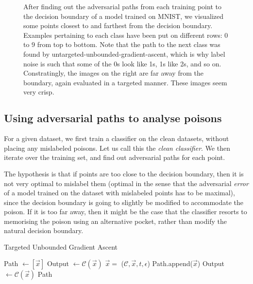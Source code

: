 \documentclass{ociamthesis}
\begin{document}
\begin{figure}
    \caption{After finding out the adversarial paths from each training point to
    the decision boundary of a model trained on MNIST, we visualized some points
    closest to and farthest from the decision boundary. Examples pertaining to
    each class have been put on different rows: 0 to 9 from top to bottom. Note
    that the path to the next class was found by
    untargeted-unbounded-gradient-ascent, which is why label noise is such that
    some of the 0s look like 1s, 1s like 2s, and so on. Constratingly, the
    images on the right are far away from the boundary, again evaluated in a
    targeted manner. These images seem very crisp.}
    \label{fig:pgd-path-examples}
\end{figure}


\subsection{Using adversarial paths to analyse poisons}

For a given dataset, we first train a classifier on the clean datasets, without
placing any mislabeled poisons. Let us call this the \emph{clean classifier}. We
then iterate over the training set, and find out adversarial paths for each
point.

The hypothesis is that if points are too close to the decision boundary, then it
is not very optimal to mislabel them (optimal in the sense that the adversarial
\emph{error} of a model trained on the dataset with mislabeled points has to be
maximal), since the decision boundary is going to slightly be modified to
accommodate the poison. If it is too far away, then it might be the case that
the classifier resorts to memorising the poison using an alternative pocket,
rather than modify the natural decision boundary.

\begin{algorithm}[!h]
\caption{Targeted Unbounded Gradient Ascent}
\begin{algorithmic}[1]
    \State Path $\gets [\vec{x}]$
    \State Output $\gets \mathcal{C}(\vec{x})$
        \State $\vec{x} =$ ($\mathcal{C}, \vec{x}, t, \epsilon$)
        \State Path.append($\vec{x}$)
        \State Output $\gets \mathcal{C}(\vec{x})$
    \EndWhile
    \State \Return Path
    \label{algorithm:unbounded-gd}
\EndProcedure

\end{algorithmic}
\end{algorithm}
\end{document}
